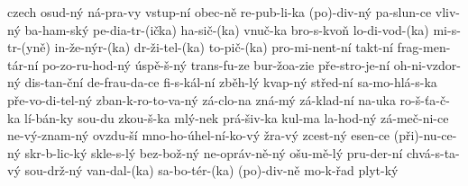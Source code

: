 \begin{hyphenrules}{czech}
{ osud-ný
 ná-pra-vy
 vstup-ní
 obec-ně
 re-pub-li-ka
 (po)-div-ný
 pa-slun-ce
 vliv-ný
 ba-ham-ský
 pe-dia-tr-(ička)
 ha-sič-(ka)
 vnuč-ka
 bro-s-kvoň
 lo-di-vod-(ka)
 mi-s-tr-(yně)
 in-že-nýr-(ka)
 dr-ži-tel-(ka)
 to-pič-(ka)
 pro-mi-nent-ní
 takt-ní
 frag-men-tár-ní
 po-zo-ru-hod-ný
 úspě-š-ný
 trans-fu-ze
 bur-žoa-zie
 pře-stro-je-ní
 oh-ni-vzdor-ný
 dis-tan-ční
 de-frau-da-ce
 fi-s-kál-ní
 zběh-lý
 kvap-ný
 střed-ní
 sa-mo-hlá-s-ka
 pře-vo-di-tel-ný
 zban-k-ro-to-va-ný
 zá-clo-na
 zná-mý
 zá-klad-ní
 na-uka
 ro-š-ťa-č-ka
 lí-bán-ky
 sou-du
 zkou-š-ka
 mlý-nek
 prá-šiv-ka
 kul-ma
 la-hod-ný
 zá-meč-ni-ce
 ne-vý-znam-ný
 ovzdu-ší
 mno-ho-úhel-ní-ko-vý
 žra-vý
 zcest-ný
 esen-ce
 (při)-nu-ce-ný
 skr-b-lic-ký
 skle-s-lý
 bez-bož-ný
 ne-opráv-ně-ný
 ošu-mě-lý
 pru-der-ní
 chvá-s-ta-vý
 sou-drž-ný
 van-dal-(ka)
 sa-bo-tér-(ka)
 (po)-div-ně
 mo-k-řad
 plyt-ký
  }
\end{hyphenrules}
